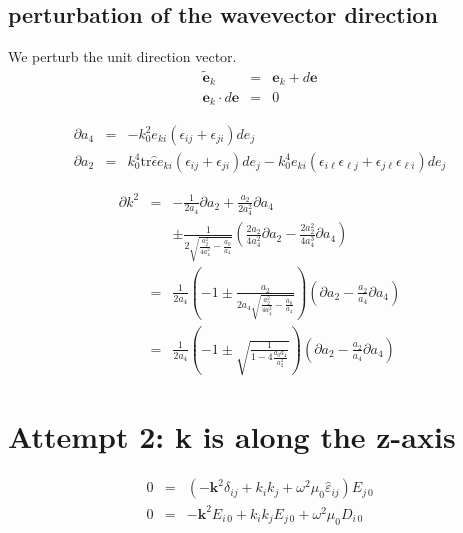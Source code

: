 \documentclass[12pt,a4paper,twoside,openright,BCOR10mm,headsepline,titlepage,abstracton,chapterprefix,final]{scrreprt}
\newcommand\Vector[1]{{\mathbf{#1}}}
\newcommand\wavenumber{k}
\newcommand\Tensor[1]{\hat{#1}}
\newcommand\permittivity{\Tensor{\scalarpermittivity}}
\newcommand\scalarrelativepermittivity{\epsilon}
\newcommand\relativepermittivity{\Tensor{\scalarrelativepermittivity}}
\newcommand\scalarpermittivity{\varepsilon}
\begin{document}
\subsection{perturbation of the wavevector direction}
We perturb the unit direction vector.
\begin{eqnarray}
 \tilde{\Vector{e}}_\wavenumber &=& \Vector{e}_\wavenumber + d\Vector{e} \\
 \Vector{e}_\wavenumber \cdot d\Vector{e} &=& 0
\end{eqnarray}

\begin{eqnarray}
 \partial a_4 &=& - k_0^2  e_{ki} ( \scalarrelativepermittivity_{ij} + \scalarrelativepermittivity_{ji} ) de_{j} \\
 \partial a_2 &=&    k_0^4 \text{tr} \relativepermittivity e_{ki} ( \scalarrelativepermittivity_{ij} + \scalarrelativepermittivity_{ji} ) de_{j} - k_0^4 e_{ki} ( \scalarrelativepermittivity_{i\ell} \scalarrelativepermittivity_{\ell j} + \scalarrelativepermittivity_{j\ell} \scalarrelativepermittivity_{\ell i} ) de_j
\end{eqnarray}

\begin{eqnarray}
 \partial k^2 &=& - \frac{1}{2 a_4} \partial a_2 + \frac{a_2}{2 a_4^2} \partial a_4 \nonumber\\
                &&\pm \frac{1}{2 \sqrt{\frac{a_2^2}{4 a_4^2} - \frac{a_0}{a_4}}}
                  \left( \frac{ 2 a_2}{4 a_4^2} \partial a_2 - \frac{ 2 a_2^2}{4 a_4^3} \partial a_4 \right)
              \\
              &=& \frac{1}{2 a_4} \left( -1 \pm \frac{a_2}{2 a_4 \sqrt{\frac{a_2^2}{4 a_4^2} - \frac{a_0}{a_4}}} \right)
                  \left( \partial a_2 - \frac{a_2}{a_4} \partial a_4 \right) 
              \\
              &=& \frac{1}{2 a_4} \left( -1 \pm \sqrt{\frac{1}{1-4 \frac{a_0 a_4}{a_2^2}}} \right)
                  \left( \partial a_2 - \frac{a_2}{a_4} \partial a_4 \right) 
\end{eqnarray}


\section{Attempt 2: k is along the z-axis}

\begin{eqnarray}
 0 &=& \left(-\Vector{k}^2 \delta_{ij} + k_i k_j + \omega^2 \mu_0 \permittivity_{ij} \right) E_{j\,0} \\
 0 &=& -\Vector{k}^2 E_{i\,0} + k_i k_j E_{j\,0} + \omega^2 \mu_0 D_{i\,0} \\
\end{eqnarray}
\end{document}
